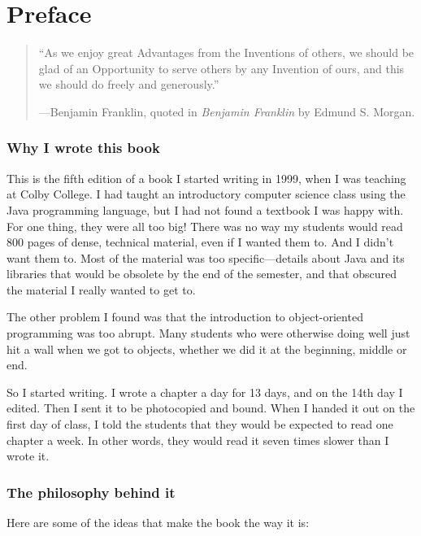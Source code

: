 \chapter{Preface}

\begin{quote}
``As we enjoy great Advantages from the Inventions of others,
we should be glad of an Opportunity to serve others by any
Invention of ours, and this we should do freely and generously.''

---Benjamin Franklin, quoted in {\em Benjamin Franklin} by
Edmund S. Morgan.
\end{quote}

\subsection*{Why I wrote this book}

This is the fifth edition of a book I started writing in 1999,
when I was teaching at Colby College.  I had taught an introductory
computer science class using the Java programming language, but I
had not found a textbook I was happy with.  For one thing,
they were all too big!  There was no way my students would read
800 pages of dense, technical material, even if I wanted them to.
And I didn't want them to.  Most of the material was too
specific---details about Java and its libraries that would be obsolete
by the end of the semester, and that obscured the material I really
wanted to get to.

The other problem I found was that the introduction to object-oriented
programming was too abrupt.  Many students who were otherwise
doing well just hit a wall when we got to objects, whether we did
it at the beginning, middle or end.

So I started writing.  I wrote a chapter a day for 13 days, and on
the 14th day I edited.  Then I sent it to be photocopied and bound.
When I handed it out on the first day of class, I told the students
that they would be expected to read one chapter a week.  In other
words, they would read it seven times slower than I wrote it.


\subsection*{The philosophy behind it}

Here are some of the ideas that make the book the way it is:

